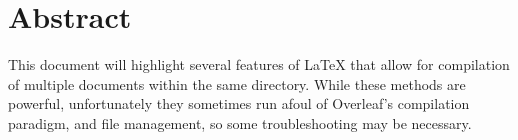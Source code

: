 \section{Abstract}
This document will highlight several features of LaTeX that allow for compilation of multiple documents within the same directory.
While these methods are powerful, unfortunately they sometimes run afoul of Overleaf's compilation paradigm, and file management, so some troubleshooting may be necessary.